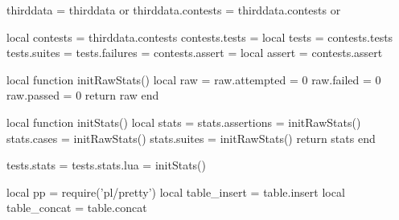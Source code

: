 thirddata          = thirddata          or {}
thirddata.contests = thirddata.contests or {}

local contests  = thirddata.contests
contests.tests  = {}
local tests     = contests.tests
tests.suites    = {}
tests.failures  = {}
contests.assert = {}
local assert    = contests.assert

local function initRawStats()
  local raw = {}
  raw.attempted = 0
  raw.failed    = 0
  raw.passed    = 0
  return raw
end

local function initStats()
  local stats = {}
  stats.assertions = initRawStats()
  stats.cases      = initRawStats()
  stats.suites     = initRawStats()
  return stats
end

tests.stats     = {}
tests.stats.lua = initStats()

local pp = require('pl/pretty')
local table_insert = table.insert
local table_concat = table.concat

\stopLuaCode

\stopchapter